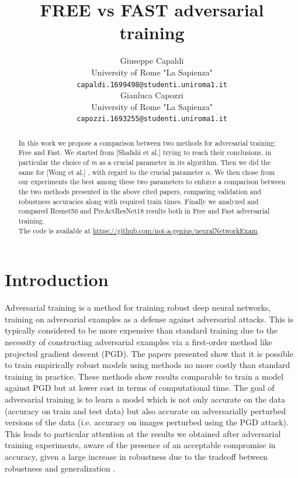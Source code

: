 \documentclass{article}
\title{FREE vs FAST adversarial training}
\author{Giuseppe Capaldi\\
	University of Rome "La Sapienza"\\
	\texttt{capaldi.1699498@studenti.uniroma1.it}\\
	\And Gianluca Capozzi\\
	University of Rome "La Sapienza"\\
	\texttt{capozzi.1693255@studenti.uniroma1.it}\\
}
\begin{document}
\maketitle

\begin{abstract}
In this work we propose a comparison between two methods for adversarial
training: Free and Fast. We started from [Shafahi et al.] \cite{ShafahiEtAl2019b} trying to reach their conclusions, in particular the choice of \textit{m} as a crucial parameter in its algorithm. Then we did the same 
for [Wong et al.] \cite{WongEtAl2020}, with regard to the crucial parameter $\alpha$.
We then chose from our experiments  the best among these two parameters to enforce a comparison between the two methods presented in the above cited papers, comparing validation and robustness accuracies along with required train times. Finally we analyzed and compared Resnet50 and PreActResNet18 results both in Free and Fast adversarial training.\\
 The code is available at
\url{https://github.com/not-a-genius/neuralNetworkExam}.
\end{abstract}

\section{Introduction}
Adversarial training is a method for training robust deep neural networks,
training on adversarial examples as a defense against adversarial attacks. This
is typically considered to be more expensive than standard training due to the
necessity of constructing adversarial examples via a first-order method like
projected gradient descent (PGD). The papers presented show that it is possible
to train empirically robust models using methods no more costly than standard
training in practice. These methods show results comparable to train a model
against PGD but at lower cost in terms of computational time. The goal of
adversarial training is to learn a model which is not only accurate on the data
(accuracy on train and test data) but also accurate on adversarially perturbed
versions of the data (i.e. accuracy on images perturbed using the PGD attack).  
This leads to particular attention at the results we obtained after adversarial
training experiments, aware of the presence of an acceptable compromise in
accuracy, given a large increase in robustness due to the tradeoff between
robustness and generalization \cite{TsiprasEtAl, ZhangEtAl2019a,
ShafahiEtAl2019a}.
\end{document}
